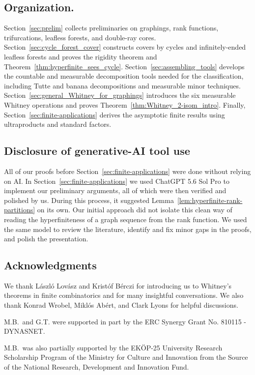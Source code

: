 \documentclass{article}
\theoremstyle{plain}
\theoremstyle{definition}
\begin{document}
\subsection*{Organization.}
Section~\ref{sec:prelim} collects preliminaries on graphings, rank functions, trifurcations, leafless forests, and double-ray cores. Section~\ref{sec:cycle_forest_cover} constructs covers by cycles and infinitely-ended leafless forests and proves the rigidity theorem and Theorem~\ref{thm:hyperfinite_sees_cycle}. Section~\ref{sec:assembling_tools} develops the countable and measurable decomposition tools needed for the classification, including Tutte and banana decompositions and measurable minor techniques. Section~\ref{sec:general_Whitney_for_graphings} introduces the six measurable Whitney operations and proves Theorem~\ref{thm:Whitney_2-isom_intro}. Finally, Section~\ref{sec:finite-applications} derives the asymptotic finite results using ultraproducts and standard factors.

\subsection*{Disclosure of generative-AI tool use}
All of our proofs before Section~\ref{sec:finite-applications} were done without relying on AI. In Section~\ref{sec:finite-applications} we used ChatGPT 5.6 Sol Pro to implement our preliminary arguments, all of which were then verified and polished by us. During this process, it suggested Lemma~\ref{lem:hyperfinite-rank-partitions} on its own. Our initial approach did not isolate this clean way of reading the hyperfiniteness of a graph sequence from the rank function. We used the same model to review the literature, identify and fix minor gaps in the proofs, and polish the presentation.

\subsection*{Acknowledgments} We thank L\'aszl\'o Lov\'asz and Krist\'of B\'erczi for introducing us to Whitney's theorems in finite combinatorics and for many insightful conversations. We also thank Konrad Wrobel, Miklós Abért, and Clark Lyons for helpful discussions.

M.B.\ and G.T. were supported in part by the ERC Synergy Grant No. 810115 - DYNASNET.

M.B.\ was also partially supported by %
the EKÖP-25 University Research Scholarship Program of the Ministry for Culture and Innovation from the Source of the National Research, Development and Innovation Fund.
\end{document}
